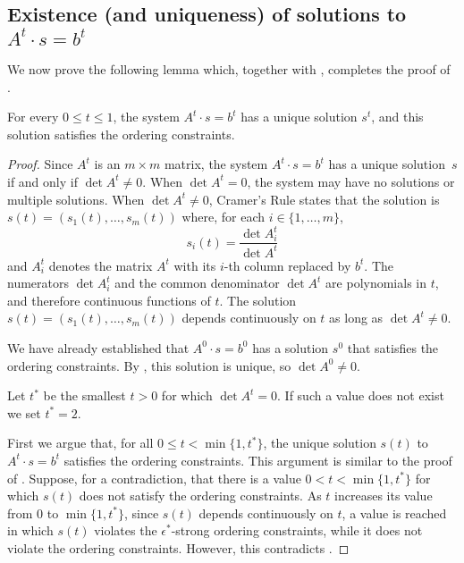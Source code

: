 \subsection{Existence (and uniqueness) of solutions to $A^t\cdot s=b^t$}

We now prove the following lemma which, together with , completes the proof of .

\begin{lem}
	For every $0\le t\le 1$, the system $A^t\cdot s=b^t$ has a
	unique solution $s^t$, and this solution satisfies the ordering
	constraints.
\end{lem}

\begin{proof}
	Since $A^t$ is an $m\times m$ matrix, the system $A^t\cdot
	s=b^t$ has a unique solution~$s$ if and only if $\det A^t \neq 0$.
	When $\det A^t =0$, the system may have no solutions or
	multiple solutions.  
	When $\det A^t\neq 0$, 
	Cramer's Rule states that
	the solution
	is $s(t)=(s_1(t),\ldots,s_m(t))$ where, for each
	$i\in\{1,\ldots,m\}$,
	\[ 
	s_i(t) = \frac{\det A^t_i}{\det A^t }
	\]
	and $A^t_i$ denotes the matrix $A^t$ with its $i$-th column replaced
	by $b^t$. 
	The numerators $\det A^t_i$ and the common
	denominator $\det A^t $ are polynomials in $t$, and therefore
	continuous
	functions of $t$.
	The solution $s(t)=(s_1(t),\ldots,s_m(t))$ depends continuously on $t$
	as long as  $\det A^t\ne0 $.
	
	We have already established that $A^0\cdot s=b^0$ has a
	solution $s^0$ that satisfies the ordering constraints. By
	, this solution is unique, so $\det A^0\neq 0$.
	
	Let $t^*$ be the smallest $t>0$
	for which 
	$\det A^{t}= 0$. If such a value does not exist we set $t^*=2$.
	
	First we argue that, for all $0\le t <\min \{1,t^*\}$, the unique solution $s(t)$ to $A^t\cdot s=b^t$ satisfies the ordering constraints. This argument is similar to the proof of . Suppose, for a contradiction, that there is a value $0<t<\min\{1,t^*\}$ for which $s(t)$ does not satisfy the ordering constraints. As $t$ increases its value from $0$ to $\min\{1,t^*\}$, since $s(t)$ depends continuously on $t$, a value is reached in which $s(t)$ violates the $\epsilon^*$-strong ordering constraints, while it does not violate the ordering constraints. However, this contradicts	.
	

\end{proof}

